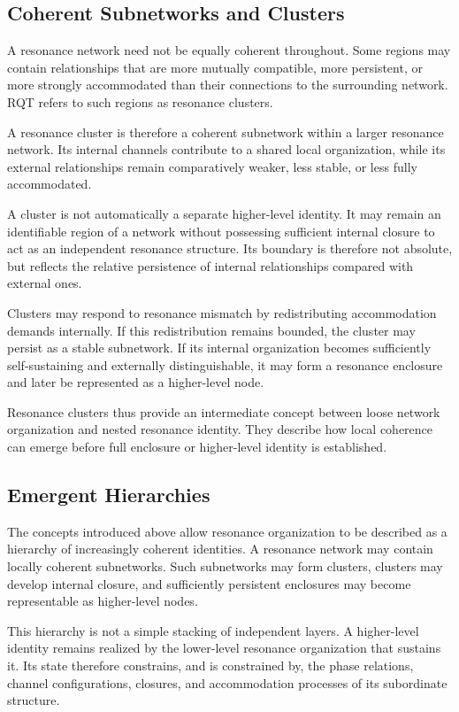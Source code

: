 \documentclass[11pt,a4paper]{article}
\begin{document}
\subsection{Coherent Subnetworks and Clusters}

A resonance network need not be equally coherent throughout. Some regions may contain relationships that are more mutually compatible, more persistent, or more strongly accommodated than their connections to the surrounding network. RQT refers to such regions as resonance clusters.

A resonance cluster is therefore a coherent subnetwork within a larger resonance network. Its internal channels contribute to a shared local organization, while its external relationships remain comparatively weaker, less stable, or less fully accommodated.

A cluster is not automatically a separate higher-level identity. It may remain an identifiable region of a network without possessing sufficient internal closure to act as an independent resonance structure. Its boundary is therefore not absolute, but reflects the relative persistence of internal relationships compared with external ones.

Clusters may respond to resonance mismatch by redistributing accommodation demands internally. If this redistribution remains bounded, the cluster may persist as a stable subnetwork. If its internal organization becomes sufficiently self-sustaining and externally distinguishable, it may form a resonance enclosure and later be represented as a higher-level node.

Resonance clusters thus provide an intermediate concept between loose network organization and nested resonance identity. They describe how local coherence can emerge before full enclosure or higher-level identity is established.


\subsection{Emergent Hierarchies}

The concepts introduced above allow resonance organization to be described as a hierarchy of increasingly coherent identities. A resonance network may contain locally coherent subnetworks. Such subnetworks may form clusters, clusters may develop internal closure, and sufficiently persistent enclosures may become representable as higher-level nodes.

This hierarchy is not a simple stacking of independent layers. A higher-level identity remains realized by the lower-level resonance organization that sustains it. Its state therefore constrains, and is constrained by, the phase relations, channel configurations, closures, and accommodation processes of its subordinate structure.
\end{document}
